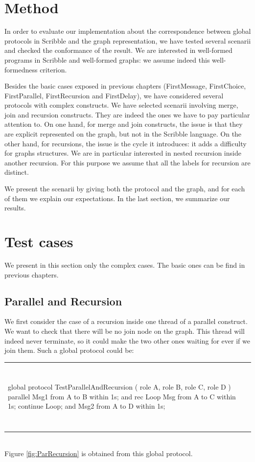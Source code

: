 \documentclass[a4paper,11pt,twoside]{report}
\begin{document}
\section{Method}
In order to evaluate our implementation about the correspondence between global protocols in Scribble and the graph representation, we have tested several scenarii and checked the conformance of the result. We are interested in well-formed programs in Scribble and well-formed graphs: we assume indeed this well-formedness criterion.

Besides the basic cases exposed in previous chapters (FirstMessage, FirstChoice, FirstParallel, FirstRecursion and FirstDelay), we have considered several protocols with complex constructs. We have selected scenarii involving merge, join and recursion constructs. They are indeed the ones we have to pay particular attention to. On one hand, for merge and join constructs, the issue is that they are explicit represented on the graph, but not in the Scribble language. On the other hand, for recursions, the issue is the cycle it introduces: it adds a difficulty for graphs structures. We are in particular interested in nested recursion inside another recursion. For this purpose we assume that all the labels for recursion are distinct.

We present the scenarii by giving both the protocol and the graph, and for each of them we explain our expectations. In the last section, we summarize our results.


\section{Test cases}
We present in this section only the complex cases. The basic ones can be find in previous chapters.

\subsection{Parallel and Recursion}
We first consider the case of a recursion inside one thread of a parallel construct. We want to check that there will be no join node on the graph. This thread will indeed never terminate, so it could make the two other ones waiting for ever if we join them. Such a global protocol could be:

\begin{tabular}{ll}
~&~\\
\begin{SJLISTING}
global protocol TestParallelAndRecursion ( role A, role B, role C, role D ) {
	parallel{ 
		Msg1 from A to B within 1s;
	} and {
 		rec Loop {
			Msg from A to C within 1s; 
			continue Loop;
		}
	} and { 
		Msg2 from A to D within 1s;
	}
}
\end{SJLISTING}
& \\
~&~\\
\end{tabular}\\
Figure \ref{fig:ParRecursion} is obtained from this global protocol.
\end{document}
